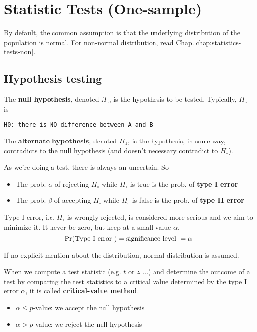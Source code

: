 
\chapter{Statistic Tests (One-sample)}
\label{chap:statistic-tests}

By default, the common assumption is that the underlying distribution of the
population is normal. For non-normal distribution, read
Chap.\ref{chap:statistics-tests-non}.

\section{Hypothesis testing}
\label{sec:hypothesis-testing}

The {\bf null hypothesis}, denoted $H_\circ$, is the hypothesis to be
tested. Typically, $H_\circ$ is  
\begin{verbatim}
H0: there is NO difference between A and B
\end{verbatim}
The {\bf alternate hypothesis}, denoted $H_1$, is the hypothesis, in
some way, contradicts to the null hypothesis (and doesn't necessary
contradict to $H_\circ$).

As we're doing a test, there is always an uncertain. So
\begin{itemize}
\item The prob. $\alpha$ of rejecting $H_\circ$ while $H_\circ$ is
  true is the prob. of {\bf type I error}
\item The prob. $\beta$ of accepting $H_\circ$ while $H_\circ$ is
  false is the prob. of {\bf type II error}
\end{itemize}
Type I error, i.e. $H_\circ$ is wrongly rejected, is considered more
serious and we aim to minimize it. It never be zero, but keep at a
small value $\alpha$. 
\begin{equation}
  \label{eq:60}
  \text{Pr}(\text{Type I error }) = \text{significance level } = \alpha
\end{equation}

\begin{framed}
  If no explicit mention about the distribution, normal distribution
  is assumed. 
\end{framed}

When we compute a test statistic (e.g. $t$ or $z$ ...) and determine
the outcome of a test by comparing the test statistics to a critical
value determined by the type I error $\alpha$, it is called
{\bf critical-value method}.
\begin{itemize}
\item $\alpha \le p$-value: we accept the null hypothesis
\item $\alpha > p$-value: we reject the null hypothesis
\end{itemize}

